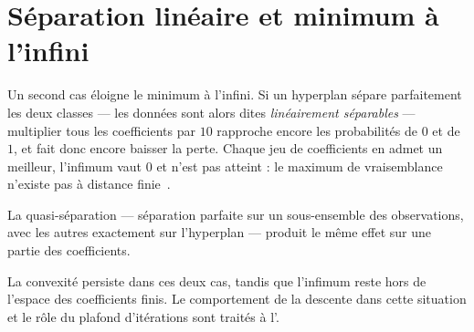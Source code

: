 \section{Séparation linéaire et minimum à l'infini}

\begin{vigilance}
Un second cas éloigne le minimum à l'infini. Si un hyperplan sépare parfaitement
les deux classes --- les données sont alors dites \emph{linéairement séparables}
--- multiplier tous les coefficients par $10$ rapproche encore les probabilités
de $0$ et de $1$, et fait donc encore baisser la perte. Chaque jeu de
coefficients en admet un meilleur, l'infimum vaut $0$ et n'est pas atteint : le
maximum de vraisemblance n'existe pas à distance finie~\cite{albert1984}.

La quasi-séparation --- séparation parfaite sur un sous-ensemble des
observations, avec les autres exactement sur l'hyperplan --- produit le même
effet sur une partie des coefficients.

La convexité persiste dans ces deux cas, tandis que l'infimum reste hors de
l'espace des coefficients finis. Le comportement de la descente dans cette
situation et le rôle du plafond d'itérations sont traités à
l'.
\end{vigilance}
